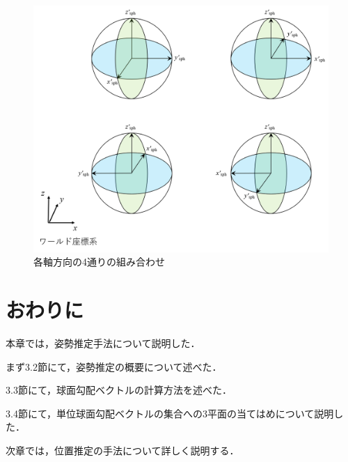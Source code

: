 \begin{figure}[b]
 \begin{center}
 \includegraphics[width=0.9\columnwidth]{./chap3/fig/four_orientation.png}
 \vspace{0mm}
 \caption{各軸方向の4通りの組み合わせ}
 \label{fig:four_orientation}
 \end{center}
\end{figure}

\clearpage
\section{おわりに}

本章では，姿勢推定手法について説明した．

まず3.2節にて，姿勢推定の概要について述べた．

3.3節にて，球面勾配ベクトルの計算方法を述べた．

3.4節にて，単位球面勾配ベクトルの集合への3平面の当てはめについて説明した．

次章では，位置推定の手法について詳しく説明する．


